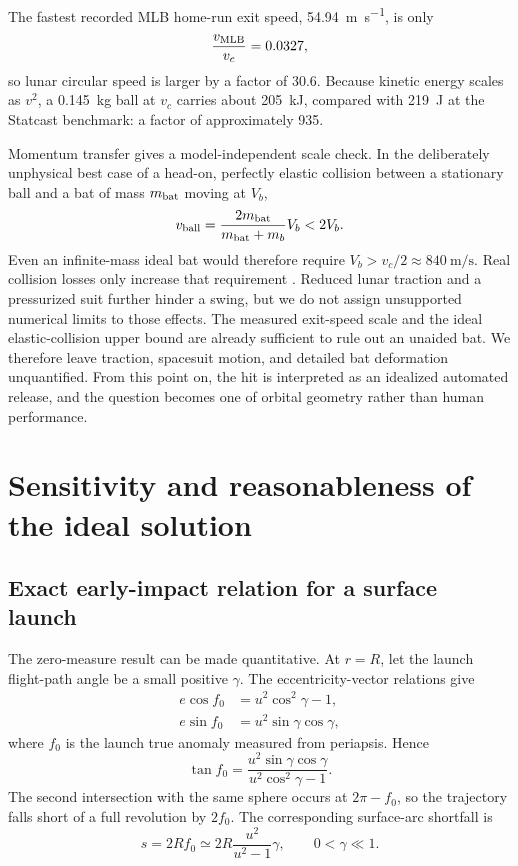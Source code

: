 The fastest recorded MLB home-run exit speed, \SI{54.94}{\metre\per\second}, is only
\begin{equation}
 \frac{v_{\rm MLB}}{v_c}=0.0327,
\end{equation}
so lunar circular speed is larger by a factor of 30.6. Because kinetic energy
scales as \(v^2\), a \SI{0.145}{kg} ball at \(v_c\) carries about
\SI{205}{kJ}, compared with \SI{219}{J} at the Statcast benchmark: a factor
of approximately 935.

Momentum transfer gives a model-independent scale check. In the deliberately
unphysical best case of a head-on, perfectly elastic collision between a
stationary ball and a bat of mass \(m_{\rm bat}\) moving at \(V_b\),
\begin{equation}
 v_{\rm ball}=\frac{2m_{\rm bat}}{m_{\rm bat}+m_b}V_b<2V_b .
\end{equation}
Even an infinite-mass ideal bat would therefore require
\(V_b>v_c/2\approx\SI{840}{\metre\per\second}\). Real collision losses only increase
that requirement \cite{Nathan2000,Adair2002}. Reduced lunar traction and a
pressurized suit further hinder a swing, but we do not assign unsupported
numerical limits to those effects. The measured exit-speed scale and the ideal elastic-collision upper bound are already sufficient to rule out an unaided bat. We therefore leave traction, spacesuit motion, and detailed bat deformation unquantified. From this point on, the hit is interpreted as an idealized automated release, and the question becomes one of orbital geometry rather than human performance.

\section{Sensitivity and reasonableness of the ideal solution}

\subsection{Exact early-impact relation for a surface launch}

The zero-measure result can be made quantitative. At $r=R$, let the launch flight-path angle be a small positive $\gamma$. The eccentricity-vector relations give
\begin{align}
 e\cos f_0&=u^2\cos^2\gamma-1,\label{eq:ecos}\\
 e\sin f_0&=u^2\sin\gamma\cos\gamma,\label{eq:esin}
\end{align}
where $f_0$ is the launch true anomaly measured from periapsis. Hence
\begin{equation}
 \tan f_0=\frac{u^2\sin\gamma\cos\gamma}
 {u^2\cos^2\gamma-1}.
\label{eq:f0}
\end{equation}
The second intersection with the same sphere occurs at  $2\pi-f_0$, so the trajectory falls short of a full revolution by $2f_0$. The corresponding surface-arc shortfall is
\begin{equation}
 s=2Rf_0\simeq2R\frac{u^2}{u^2-1}\gamma,
 \qquad 0<\gamma\ll1.
\label{eq:shortfall}
\end{equation}

